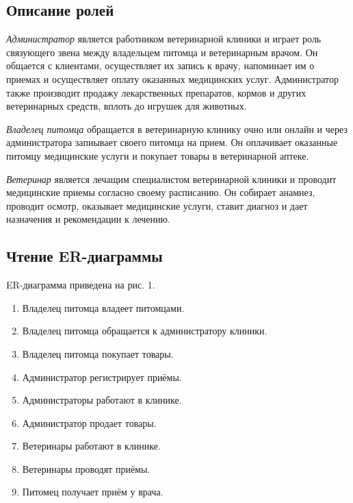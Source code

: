 \documentclass[a4paper]{article}
\begin{document}
\subsection {Описание ролей}
\textit{Администратор} является работником ветеринарной клиники и играет роль связующего звена между владельцем питомца и ветеринарным врачом. Он общается с клиентами, осуществляет их запись к врачу, напоминает им о приемах и осуществляет оплату оказанных медицинских услуг. Администратор также производит продажу лекарственных препаратов, кормов и других ветеринарных средств, вплоть до игрушек для животных.

\textit{Владелец питомца} обращается в ветеринарную клинику очно или онлайн и  через администратора запиывает своего питомца на прием. Он оплачивает оказанные питомцу медицинские услуги и покупает товары в ветеринарной аптеке.

\textit{Ветеринар} является лечащим специалистом ветеринарной клиники и проводит медицинские приемы согласно своему расписанию. Он собирает анамнез, проводит осмотр, оказывает медицинские услуги, ставит диагноз и дает назначения и рекомендации к лечению.



\setcounter{subsection}{5}
\subsection {Чтение ER-диаграммы}
ER-диаграмма приведена на рис. 1.
\begin{enumerate}
\item Владелец питомца владеет питомцами.

\item Владелец питомца обращается к администратору клиники.

\item Владелец питомца покупает товары.

\item Администратор регистрирует приёмы.

\item Администраторы работают в клинике.

\item Администратор продает товары.

\item Ветеринары работают в клинике. 

\item Ветеринары проводят приёмы. 

\item Питомец получает приём у врача.
\end{enumerate}
\end{document}
